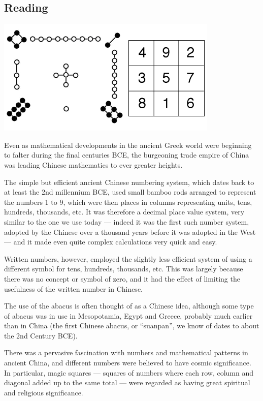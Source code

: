 


\subsection*{Reading}
\begin{center}
  \includegraphics[width=0.5\linewidth]{chinese_magic_square}
\end{center}
Even as mathematical developments in the ancient Greek world were beginning to falter during the final centuries BCE, the burgeoning trade empire of China was leading Chinese mathematics to ever greater heights.

The simple but efficient ancient Chinese numbering system, which dates back to at least the 2nd millennium BCE, used small bamboo rods arranged to represent the numbers 1 to 9, which were then places in columns representing units, tens, hundreds, thousands, etc. It was therefore a decimal place value system, very similar to the one we use today --- indeed it was the first such number system, adopted by the Chinese over a thousand years before it was adopted in the West --- and it made even quite complex calculations very quick and easy.

Written numbers, however, employed the slightly less efficient system of using a different symbol for tens, hundreds, thousands, etc. This was largely because there was no concept or symbol of zero, and it had the effect of limiting the usefulness of the written number in Chinese.

The use of the abacus is often thought of as a Chinese idea, although some type of abacus was in use in Mesopotamia, Egypt and Greece, probably much earlier than in China (the first Chinese abacus, or ``suanpan'', we know of dates to about the 2nd Century BCE).

There was a pervasive fascination with numbers and mathematical patterns in ancient China, and different numbers were believed to have cosmic significance. In particular, magic squares --- squares of numbers where each row, column and diagonal added up to the same total --- were regarded as having great spiritual and religious significance.

